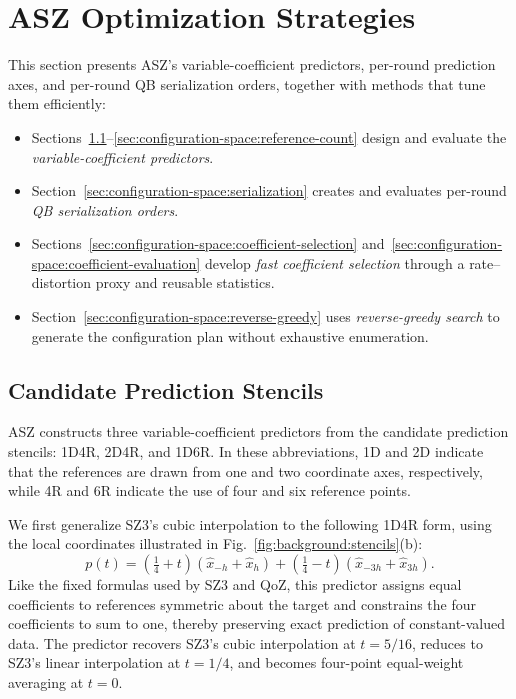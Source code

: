 \section{ASZ Optimization Strategies}
\label{sec:optimization-strategies}

This section presents ASZ's variable-coefficient predictors, per-round prediction axes, and per-round QB serialization orders, together with methods that tune them efficiently:
\begin{itemize}
\item Sections~\ref{sec:configuration-space:predictors}--\ref{sec:configuration-space:reference-count} design and evaluate the \emph{variable-coefficient predictors}.
\item Section~\ref{sec:configuration-space:serialization} creates and evaluates per-round \emph{QB serialization orders}.
\item Sections~\ref{sec:configuration-space:coefficient-selection} and~\ref{sec:configuration-space:coefficient-evaluation} develop \emph{fast coefficient selection} through a rate--distortion proxy and reusable statistics.
\item Section~\ref{sec:configuration-space:reverse-greedy} uses \emph{reverse-greedy search} to generate the configuration plan without exhaustive enumeration.
\end{itemize}
\subsection{Candidate Prediction Stencils}
\label{sec:configuration-space:predictors}

ASZ constructs three variable-coefficient predictors from the candidate prediction stencils: 1D4R, 2D4R, and 1D6R. In these abbreviations, 1D and 2D indicate that the references are drawn from one and two coordinate axes, respectively, while 4R and 6R indicate the use of four and six reference points.

We first generalize SZ3's cubic interpolation to the following 1D4R form, using the local coordinates illustrated in Fig.~\ref{fig:background:stencils}(b):
\begin{equation}
\label{eq:configuration-space:1d4r-prediction}
p(t)=(\tfrac14+t)(\hat x_{-h}+\hat x_h)+(\tfrac14-t)(\hat x_{-3h}+\hat x_{3h}).
\end{equation}
Like the fixed formulas used by SZ3 and QoZ, this predictor assigns equal coefficients to references symmetric about the target and constrains the four coefficients to sum to one, thereby preserving exact prediction of constant-valued data. The predictor recovers SZ3's cubic interpolation at $t=5/16$, reduces to SZ3's linear interpolation at $t=1/4$, and becomes four-point equal-weight averaging at $t=0$.


